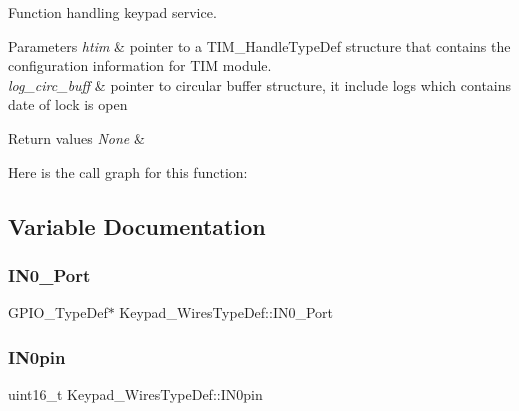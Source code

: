 Function handling keypad service. 


\begin{DoxyParams}{Parameters}
{\em htim} & pointer to a T\+I\+M\+\_\+\+Handle\+Type\+Def structure that contains the configuration information for T\+IM module. \\
\hline
{\em log\+\_\+circ\+\_\+buff} & pointer to circular buffer structure, it include logs which contains date of lock is open \\
\hline
\end{DoxyParams}

\begin{DoxyRetVals}{Return values}
{\em None} & \\
\hline
\end{DoxyRetVals}
Here is the call graph for this function\+:


\subsection{Variable Documentation}
\mbox{\label{group___key_pad___functions_ga47955289b19390cde1cbc4c77f042369}} 
\subsubsection{\texorpdfstring{I\+N0\+\_\+\+Port}{IN0\_Port}}
{\footnotesize\ttfamily G\+P\+I\+O\+\_\+\+Type\+Def$\ast$ Keypad\+\_\+\+Wires\+Type\+Def\+::\+I\+N0\+\_\+\+Port}

\mbox{\label{group___key_pad___functions_ga1982da4b510d015cde3d54a120d32461}} 
\subsubsection{\texorpdfstring{I\+N0pin}{IN0pin}}
{\footnotesize\ttfamily uint16\+\_\+t Keypad\+\_\+\+Wires\+Type\+Def\+::\+I\+N0pin}

\mbox{\label{group___key_pad___functions_gacaa68d159d45a332a4932cd1b169d2ea}} 
